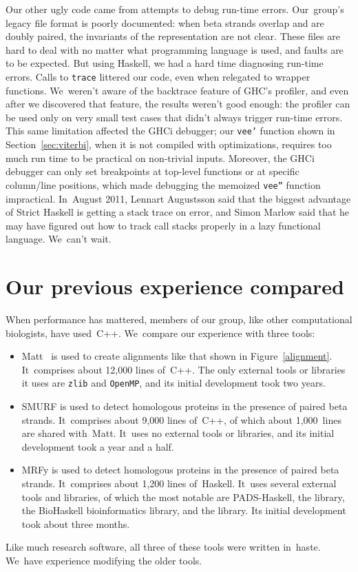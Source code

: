 \documentclass[preprint,nonatbib,blockstyle,nocopyrightspace,times]{sigplanconf}
\newcommand\figref[1]{Figure~\ref{#1}}
\newcommand\secref[1]{Section~\ref{sec:#1}}
\newcommand\seclabel[1]{\label{sec:#1}}
\let\cite\citep
\begin{document}
Our other ugly code came from  attempts to debug
run-time errors.
Our~group's legacy file
format is poorly documented: when beta
strands overlap and are doubly paired, the invariants of the
representation are not clear.
These files are hard to deal with no matter what
programming language is used, and faults are to be expected.
But using Haskell, we had a hard time diagnosing run-time errors.
Calls to
\texttt{trace} 
littered our code,
even when relegated to wrapper functions.
We~weren't aware of the backtrace feature of GHC's profiler,
and even after we discovered that feature, the results weren't good enough:
the profiler can be used only on very small test cases that didn't always trigger
run-time errors.
This same limitation affected the GHCi debugger; our \texttt{vee'} function
shown in \secref{viterbi}, when it is not compiled with
optimizations, requires too much run time to be practical on non-trivial
inputs.
Moreover, the GHCi debugger can only set breakpoints at top-level functions
or at specific column/line positions, which made debugging the memoized
\texttt{vee''} function impractical.
In~August 2011, 
Lennart Augustsson said that the biggest advantage of Strict
Haskell is getting a stack trace on error,
and Simon Marlow said that he may have figured out how to track call
stacks properly in a lazy functional language.
We~can't wait.

 
 
\section{Our previous experience compared}
\seclabel{comparo}

When performance has mattered, members of our group, like other
computational biologists, have used~C++.
We~compare our experience with three tools:
\begin{itemize}
\item
Matt~\cite{Menke:2008wu} is used to create alignments like that shown
in \figref{alignment}.
It~comprises about 12,000 lines of~C++.
The only external tools or libraries it uses are \texttt{zlib}
and \texttt{OpenMP}, and its initial development took two years.
\item
SMURF
\cite{Menke:2010ti} is used to detect homologous proteins in the presence
of paired beta strands.
It~comprises about 9,000 lines of~C++, of which about 1,000~lines are
shared with~Matt.
It~uses no external tools or libraries, and
its initial development took a year and a half.
\item
MRFy is used to detect homologous proteins in the presence of paired
beta strands.
It~comprises about 1,200 lines of~Haskell.
It~uses several external tools and libraries, of which the most
notable are PADS-Haskell, the  library,
the BioHaskell bioinformatics library, and the  library.
Its initial development took about three months.
\end{itemize}
Like much research software, all three of these tools were written
 in~haste.
We~have experience modifying the older tools.
\end{document}
